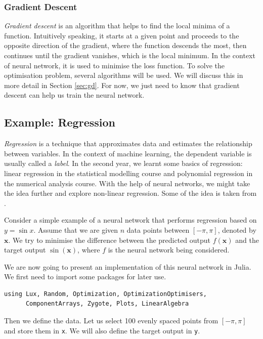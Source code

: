 \documentclass[a4paper,11pt,titlepage]{article}
\theoremstyle{definition}
\theoremstyle{plain}
\theoremstyle{remark}
\begin{document}
\subsubsection{Gradient Descent}

\textit{Gradient descent} is an algorithm that helps to find the local minima of a function. Intuitively speaking, it starts at a given point and proceeds to the opposite direction of the gradient, where the function descends the most, then continues until the gradient vanishes, which is the local minimum. In the context of neural network, it is used to minimise the loss function. To solve the optimisation problem, several algorithms will be used. We will discuss this in more detail in Section \ref{sec:gd}. For now, we just need to know that gradient descent can help us train the neural network.

\subsection{Example: Regression}

\textit{Regression} is a technique that approximates data and estimates the relationship between variables. In the context of machine learning, the dependent variable is usually called a \textit{label}. In the second year, we learnt some basics of regression: linear regression in the statistical modelling course and polynomial regression in the numerical analysis course. With the help of neural networks, we might take the idea further and explore non-linear regression. Some of the idea is taken from \cite{SciMLSANUM2024}.

Consider a simple example of a neural network that performs regression based on $y = \sin x$. Assume that we are given $n$ data points between $[-\pi, \pi]$, denoted by $\mathbf{x}$. We try to minimise the difference between the predicted output $f(\mathbf{x})$ and the target output $\sin (\mathbf{x})$, where $f$ is the neural network being considered.

We are now going to present an implementation of this neural network in Julia. We first need to import some packages for later use. 

\begin{verbatim}
using Lux, Random, Optimization, OptimizationOptimisers,
      ComponentArrays, Zygote, Plots, LinearAlgebra
\end{verbatim}

Then we define the data. Let us select 100 evenly spaced points from $[-\pi, \pi]$ and store them in \verb|x|. We will also define the target output in \verb|y|.
\end{document}
